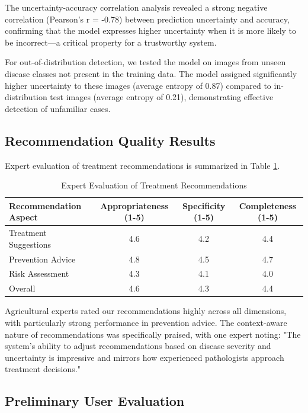 The uncertainty-accuracy correlation analysis revealed a strong negative correlation (Pearson's r = -0.78) between prediction uncertainty and accuracy, confirming that the model expresses higher uncertainty when it is more likely to be incorrect—a critical property for a trustworthy system.

For out-of-distribution detection, we tested the model on images from unseen disease classes not present in the training data. The model assigned significantly higher uncertainty to these images (average entropy of 0.87) compared to in-distribution test images (average entropy of 0.21), demonstrating effective detection of unfamiliar cases.

\subsection{Recommendation Quality Results}

Expert evaluation of treatment recommendations is summarized in Table \ref{tab:recommendation-quality}.

\begin{table}[h]
\centering
\caption{Expert Evaluation of Treatment Recommendations}
\label{tab:recommendation-quality}
\begin{tabular}{lccc}
\hline
\textbf{Recommendation Aspect} & \textbf{Appropriateness (1-5)} & \textbf{Specificity (1-5)} & \textbf{Completeness (1-5)} \\
\hline
Treatment Suggestions & 4.6 & 4.2 & 4.4 \\
Prevention Advice & 4.8 & 4.5 & 4.7 \\
Risk Assessment & 4.3 & 4.1 & 4.0 \\
Overall & 4.6 & 4.3 & 4.4 \\
\hline
\end{tabular}
\end{table}

Agricultural experts rated our recommendations highly across all dimensions, with particularly strong performance in prevention advice. The context-aware nature of recommendations was specifically praised, with one expert noting: "The system's ability to adjust recommendations based on disease severity and uncertainty is impressive and mirrors how experienced pathologists approach treatment decisions."

\subsection{Preliminary User Evaluation}

